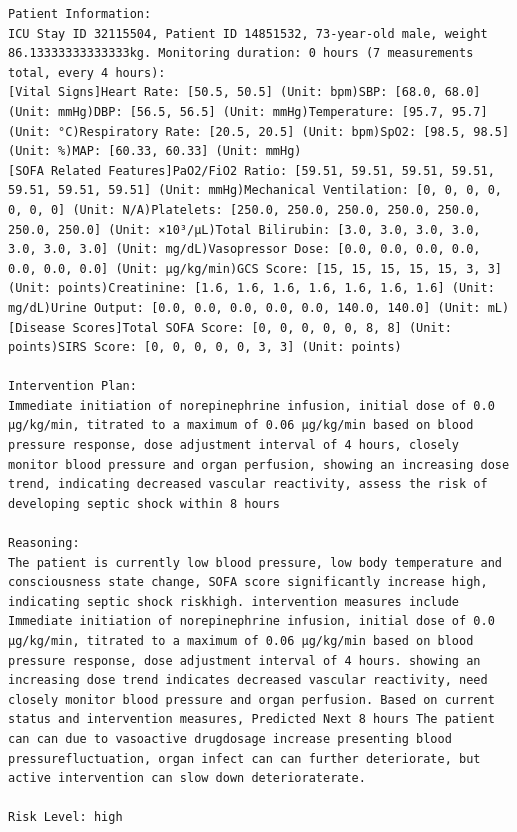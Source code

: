 \documentclass{article}
\begin{document}
\begin{lstlisting}[caption={Result for Patient 32115504}, label={lst:32115504}]
Patient Information:
ICU Stay ID 32115504, Patient ID 14851532, 73-year-old male, weight 86.13333333333333kg. Monitoring duration: 0 hours (7 measurements total, every 4 hours):
[Vital Signs]Heart Rate: [50.5, 50.5] (Unit: bpm)SBP: [68.0, 68.0] (Unit: mmHg)DBP: [56.5, 56.5] (Unit: mmHg)Temperature: [95.7, 95.7] (Unit: °C)Respiratory Rate: [20.5, 20.5] (Unit: bpm)SpO2: [98.5, 98.5] (Unit: %)MAP: [60.33, 60.33] (Unit: mmHg)
[SOFA Related Features]PaO2/FiO2 Ratio: [59.51, 59.51, 59.51, 59.51, 59.51, 59.51, 59.51] (Unit: mmHg)Mechanical Ventilation: [0, 0, 0, 0, 0, 0, 0] (Unit: N/A)Platelets: [250.0, 250.0, 250.0, 250.0, 250.0, 250.0, 250.0] (Unit: ×10³/μL)Total Bilirubin: [3.0, 3.0, 3.0, 3.0, 3.0, 3.0, 3.0] (Unit: mg/dL)Vasopressor Dose: [0.0, 0.0, 0.0, 0.0, 0.0, 0.0, 0.0] (Unit: μg/kg/min)GCS Score: [15, 15, 15, 15, 15, 3, 3] (Unit: points)Creatinine: [1.6, 1.6, 1.6, 1.6, 1.6, 1.6, 1.6] (Unit: mg/dL)Urine Output: [0.0, 0.0, 0.0, 0.0, 0.0, 140.0, 140.0] (Unit: mL)
[Disease Scores]Total SOFA Score: [0, 0, 0, 0, 0, 8, 8] (Unit: points)SIRS Score: [0, 0, 0, 0, 0, 3, 3] (Unit: points)

Intervention Plan:
Immediate initiation of norepinephrine infusion, initial dose of 0.0 μg/kg/min, titrated to a maximum of 0.06 μg/kg/min based on blood pressure response, dose adjustment interval of 4 hours, closely monitor blood pressure and organ perfusion, showing an increasing dose trend, indicating decreased vascular reactivity, assess the risk of developing septic shock within 8 hours

Reasoning:
The patient is currently low blood pressure, low body temperature and consciousness state change, SOFA score significantly increase high, indicating septic shock riskhigh. intervention measures include Immediate initiation of norepinephrine infusion, initial dose of 0.0 μg/kg/min, titrated to a maximum of 0.06 μg/kg/min based on blood pressure response, dose adjustment interval of 4 hours. showing an increasing dose trend indicates decreased vascular reactivity, need closely monitor blood pressure and organ perfusion. Based on current status and intervention measures, Predicted Next 8 hours The patient can can due to vasoactive drugdosage increase presenting blood pressurefluctuation, organ infect can can further deteriorate, but active intervention can slow down deterioraterate.

Risk Level: high
\end{lstlisting}
\end{document}
